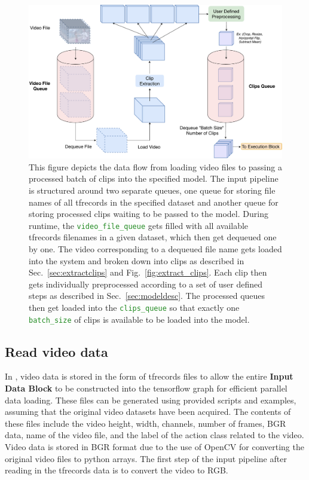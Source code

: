 \documentclass{llncs}
\begin{document}
\begin{figure}[t!]
\centering
\includegraphics[width=1.0\columnwidth]{images/ip_pipeline.pdf}
\caption{This figure depicts the data flow from loading video files to passing a processed batch of clips into the specified model.
The input pipeline is structured around two separate queues, one queue for storing file names of all tfrecords in the specified dataset and another queue for storing processed clips waiting to be passed to the model.
During runtime, the \texttt{\textcolor{ForestGreen}{video\_file\_queue}} gets filled with all available tfrecords filenames in a given dataset, which then get dequeued one by one.
The video corresponding to a dequeued file name gets loaded into the system and broken down into clips as described in Sec.~\ref{sec:extractclips} and Fig.~\ref{fig:extract_clips}.
Each clip then gets individually preprocessed according to a set of user defined steps as described in Sec.~\ref{sec:modeldesc}.
The processed queues then get loaded into the \texttt{\textcolor{ForestGreen}{clips\_queue}} so that exactly one \texttt{\textcolor{ForestGreen}{batch\_size}} of clips is available to be loaded into the model.}
\label{fig:ip_block}
\end{figure}


\subsection{Read video data}
\label{sec:readdata}
In \acro, video data is stored in the form of tfrecords files to allow the entire \textbf{Input Data Block} to be constructed into the tensorflow graph for efficient parallel data loading.
These files can be generated using provided scripts and examples, assuming that the original video datasets have been acquired.
The contents of these files include the video height, width, channels, number of frames, BGR data, name of the video file, and the label of the action class related to the video.
Video data is stored in BGR format due to the use of OpenCV for converting the original video files to python arrays.
The first step of the input pipeline after reading in the tfrecords data is to convert the video to RGB.
\end{document}

